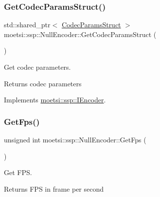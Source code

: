 \mbox{\label{classmoetsi_1_1ssp_1_1NullEncoder_a29839bd02ad42ecd9cf8e6cce707a9fe}} 
\subsubsection{\texorpdfstring{Get\+Codec\+Params\+Struct()}{GetCodecParamsStruct()}}
{\footnotesize\ttfamily std\+::shared\+\_\+ptr$<$ \hyperlink{structmoetsi_1_1ssp_1_1CodecParamsStruct}{Codec\+Params\+Struct} $>$ moetsi\+::ssp\+::\+Null\+Encoder\+::\+Get\+Codec\+Params\+Struct (\begin{DoxyParamCaption}{ }\end{DoxyParamCaption})\hspace{0.3cm}{\ttfamily [virtual]}}



Get codec parameters. 

\begin{DoxyReturn}{Returns}
codec parameters 
\end{DoxyReturn}


Implements \hyperlink{classmoetsi_1_1ssp_1_1IEncoder_ad5179efaa4c74207766dd64f46f4059a}{moetsi\+::ssp\+::\+I\+Encoder}.

\mbox{\label{classmoetsi_1_1ssp_1_1NullEncoder_ad6727fa08528622081aa4eca4aacc6c1}} 
\subsubsection{\texorpdfstring{Get\+Fps()}{GetFps()}}
{\footnotesize\ttfamily unsigned int moetsi\+::ssp\+::\+Null\+Encoder\+::\+Get\+Fps (\begin{DoxyParamCaption}{ }\end{DoxyParamCaption})\hspace{0.3cm}{\ttfamily [virtual]}}



Get F\+PS. 

\begin{DoxyReturn}{Returns}
F\+PS in frame per second 
\end{DoxyReturn}


